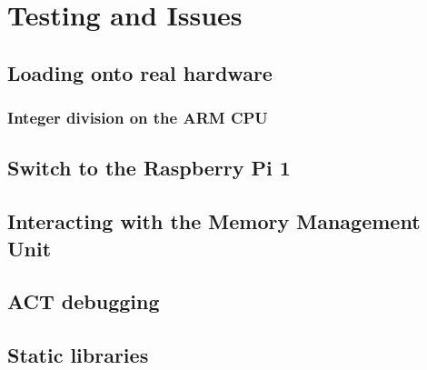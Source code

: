 \section{Testing and Issues}
\subsection{Loading onto real hardware}
    \subsubsection{Integer division on the ARM CPU}
\subsection{Switch to the Raspberry Pi 1}
\subsection{Interacting with the Memory Management Unit}
\subsection{ACT debugging}
\subsection{Static libraries}
